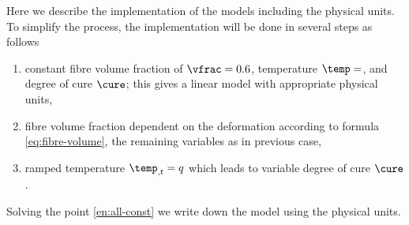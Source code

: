 \documentclass[twoside,a4paper,12pt]{article}
\newcommand{\QM}{}
\begin{document}
Here we describe the implementation of the models including the
physical units. To simplify the process, the implementation will be
done in several steps as follows
%
\begin{enumerate}
\item constant fibre volume fraction of $\vfrac = 0.6$, temperature $\temp=\QM$, and degree of cure $\cure$; this gives a linear model with appropriate physical units, \label{en:all-const}
\item fibre volume fraction dependent on the deformation according to formula \eqref{eq:fibre-volume}, the remaining variables as in previous case,
\item ramped temperature $\temp_{,t} = q$ which leads to variable degree of cure $\cure$.
\end{enumerate}

Solving the point \ref{en:all-const} we write down the model using the physical units.







\end{document}
